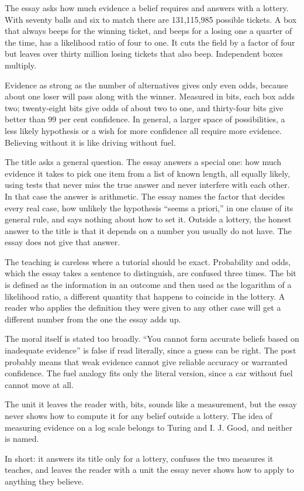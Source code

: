 \begin{afterword}
\summaryhead

The essay asks how much evidence a belief requires and answers with a lottery. With seventy balls and six to match there are 131,115,985 possible tickets. A box that always beeps for the winning ticket, and beeps for a losing one a quarter of the time, has a likelihood ratio of four to one. It cuts the field by a factor of four but leaves over thirty million losing tickets that also beep. Independent boxes multiply.

Evidence as strong as the number of alternatives gives only even odds, because about one loser will pass along with the winner. Measured in bits, each box adds two; twenty-eight bits give odds of about two to one, and thirty-four bits give better than 99 per cent confidence. In general, a larger space of possibilities, a less likely hypothesis or a wish for more confidence all require more evidence. Believing without it is like driving without fuel.

\responsehead

The title asks a general question. The essay answers a special one: how much evidence it takes to pick one item from a list of known length, all equally likely, using tests that never miss the true answer and never interfere with each other. In that case the answer is arithmetic. The essay names the factor that decides every real case, how unlikely the hypothesis ``seems a priori,'' in one clause of its general rule, and says nothing about how to set it. Outside a lottery, the honest answer to the title is that it depends on a number you usually do not have. The essay does not give that answer.

The teaching is careless where a tutorial should be exact. Probability and odds, which the essay takes a sentence to distinguish, are confused three times. The bit is defined as the information in an outcome and then used as the logarithm of a likelihood ratio, a different quantity that happens to coincide in the lottery. A reader who applies the definition they were given to any other case will get a different number from the one the essay adds up.

The moral itself is stated too broadly. ``You cannot form accurate beliefs based on inadequate evidence'' is false if read literally, since a guess can be right. The post probably means that weak evidence cannot give reliable accuracy or warranted confidence. The fuel analogy fits only the literal version, since a car without fuel cannot move at all.

The unit it leaves the reader with, bits, sounds like a measurement, but the essay never shows how to compute it for any belief outside a lottery. The idea of measuring evidence on a log scale belongs to Turing and I. J. Good, and neither is named.

In short: it answers its title only for a lottery, confuses the two measures it teaches, and leaves the reader with a unit the essay never shows how to apply to anything they believe.
\end{afterword}
